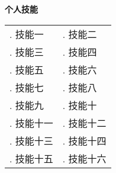 \begin{flushleft}
  \Large\textbf{个人技能}
  \\[4mm]
  \normalsize{
    \begin{tabular}{p{} p{}}
      . 技能一 & . 技能二\\[2mm]
      . 技能三 & . 技能四\\[2mm]
      . 技能五 & . 技能六\\[2mm]
      . 技能七 & . 技能八\\[2mm]
      . 技能九 & . 技能十\\[2mm]
      . 技能十一 & . 技能十二\\[2mm]
      . 技能十三 & . 技能十四\\[2mm]
      . 技能十五 & . 技能十六\\[2mm]
    \end{tabular}
  }
\end{flushleft}
